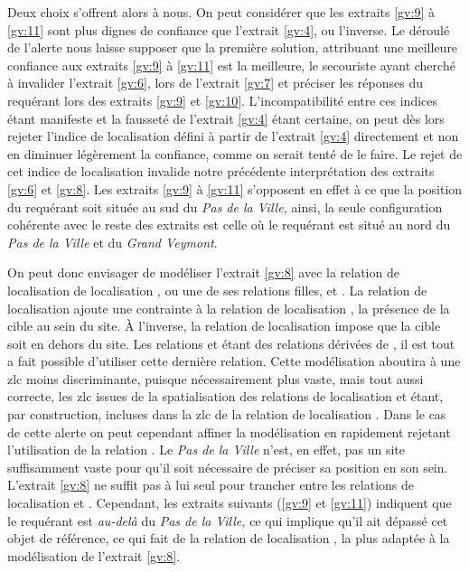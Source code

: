 Deux choix s'offrent alors à nous. On peut considérer que les extraits
\ref{gv:9} à \ref{gv:11} sont plus dignes de confiance que l'extrait
\ref{gv:4}, ou l'inverse. Le déroulé de l'alerte nous laisse supposer
que la première solution, attribuant une meilleure confiance aux
extraits \ref{gv:9} à \ref{gv:11} est la meilleure, le secouriste
ayant cherché à invalider l'extrait \ref{gv:6}, lors de l'extrait
\ref{gv:7} et préciser les réponses du requérant lors des extraits
\ref{gv:9} et \ref{gv:10}. L'incompatibilité entre ces indices étant
manifeste et la fausseté de l'extrait \ref{gv:4} étant certaine, on
peut dès lors rejeter l'indice de localisation défini à partir de
l'extrait \ref{gv:4} directement et non en diminuer légèrement la
confiance, comme on serait tenté de le faire. Le rejet de cet indice
de localisation invalide notre précédente interprétation des extraits
\ref{gv:6} et \ref{gv:8}. Les extraits \ref{gv:9} à \ref{gv:11}
s'opposent en effet à ce que la position du requérant soit située au
sud du \emph{Pas de la Ville,} ainsi, la seule configuration cohérente
avec le reste des extraits est celle où le requérant est situé au nord
du \emph{Pas de la Ville} et du \emph{Grand Veymont}.

On peut donc envisager de modéliser l'extrait \ref{gv:8} avec la
relation de localisation de localisation , ou
une de ses relations filles,  et
. La relation de localisation
 ajoute une contrainte à la
relation de localisation , la présence de la
cible au sein du site. À l'inverse, la relation de localisation
 impose que la cible soit en dehors
du site. Les relations  et
 étant des relations dérivées de
, il est tout a fait possible d'utiliser cette
dernière relation. Cette modélisation aboutira à une \ac{zlc} moins
discriminante, puisque nécessairement plus vaste, mais tout aussi
correcte, les \ac{zlc} issues de la spatialisation des relations de
localisation  et
 étant, par construction, incluses
dans la \ac{zlc} de la relation de localisation
. Dans le cas de cette alerte on peut
cependant affiner la modélisation en rapidement rejetant l'utilisation
de la relation . Le \emph{Pas de
  la Ville} n'est, en effet, pas un site suffisamment vaste pour qu'il
soit nécessaire de préciser sa position en son sein. L'extrait
\ref{gv:8} ne suffit pas à lui seul pour trancher entre les relations
de localisation  et
. Cependant, les extraits suivants
(\ref{gv:9} et \ref{gv:11}) indiquent que le requérant est
\emph{au-delà} du \emph{Pas de la Ville,} ce qui implique qu'il ait
dépassé cet objet de référence, ce qui fait de la relation de
localisation , la plus adaptée à la
modélisation de l'extrait \ref{gv:8}.

